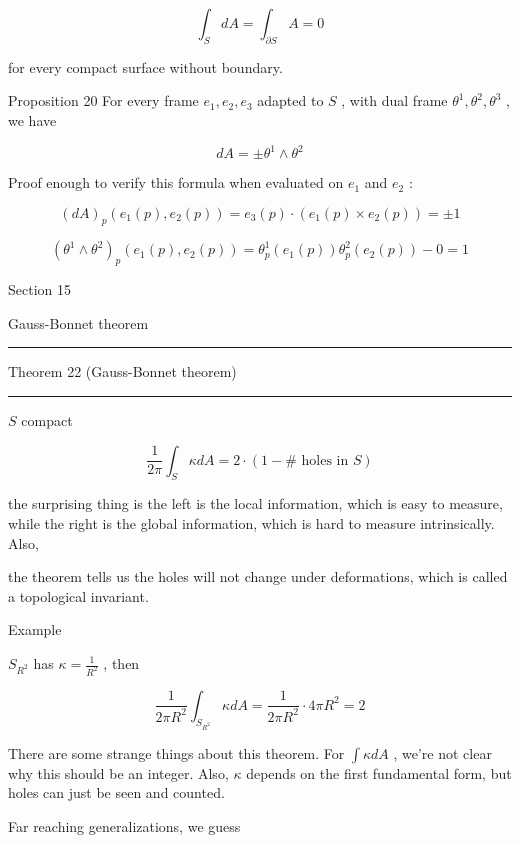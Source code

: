 \documentclass[lang=cn,a4paper,11pt,openany,twoside]{elegantbook}
\newcommand{\HRule}{\begin{center}\rule{0.9\linewidth}{0.2mm}\end{center}}
\begin{document}
\[
{\int }_{S}{dA} = {\int }_{\partial S}A = 0
\]

for every compact surface without boundary.

Proposition 20 For every frame \({e}_{1},{e}_{2},{e}_{3}\) adapted to \(S\) , with dual frame \({\theta }^{1},{\theta }^{2},{\theta }^{3}\) , we have

\[
{dA} =  \pm  {\theta }^{1} \land  {\theta }^{2}
\]

Proof enough to verify this formula when evaluated on \({e}_{1}\) and \({e}_{2}\) :

\[
{\left( dA\right) }_{p}\left( {{e}_{1}\left( p\right) ,{e}_{2}\left( p\right) }\right)  = {e}_{3}\left( p\right)  \cdot  \left( {{e}_{1}\left( p\right)  \times  {e}_{2}\left( p\right) }\right)  =  \pm  1
\]

\[
{\left( {\theta }^{1} \land  {\theta }^{2}\right) }_{p}\left( {{e}_{1}\left( p\right) ,{e}_{2}\left( p\right) }\right)  = {\theta }_{p}^{1}\left( {{e}_{1}\left( p\right) }\right) {\theta }_{p}^{2}\left( {{e}_{2}\left( p\right) }\right)  - 0 = 1
\]

Section 15

Gauss-Bonnet theorem

\HRule

Theorem 22 (Gauss-Bonnet theorem)

\HRule

\(S\) compact

\[
\frac{1}{2\pi }{\int }_{S}{\kappa dA} = 2 \cdot  \left( {1 - \# \text{ holes in }S}\right)
\]

the surprising thing is the left is the local information, which is easy to measure, while the right is the global information, which is hard to measure intrinsically. Also,

the theorem tells us the holes will not change under deformations, which is called a topological invariant.

Example

\({S}_{{R}^{2}}\) has \(\kappa  = \frac{1}{{R}^{2}}\) , then

\[
\frac{1}{{2\pi }{R}^{2}}{\int }_{{S}_{{R}^{2}}}{\kappa dA} = \frac{1}{{2\pi }{R}^{2}} \cdot  {4\pi }{R}^{2} = 2
\]

There are some strange things about this theorem. For \(\int {\kappa dA}\) , we’re not clear why this should be an integer. Also, \(\kappa\) depends on the first fundamental form, but holes can just be seen and counted.

Far reaching generalizations, we guess
\end{document}
